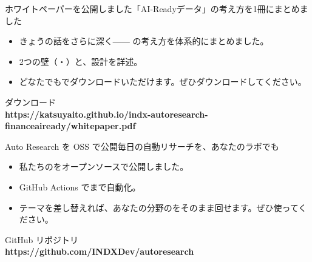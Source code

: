 
\begin{frame}{ホワイトペーパーを公開しました}{「AI-Readyデータ」の考え方を1冊にまとめました}
  \begin{itemize}\small\setlength\itemsep{2.4mm}
    \item きょうの話をさらに深く―― の考え方を体系的にまとめました。
    \item 2つの壁（・）と、設計を詳述。
    \item どなたでもでダウンロードいただけます。ぜひダウンロードしてください。
  \end{itemize}
  \vfill
  \begin{tcolorbox}[enhanced,colback=brandnavy!5,colframe=brandnavy,boxrule=0.8pt,arc=1.4mm,
    left=3mm,right=3mm,top=2.2mm,bottom=2.2mm,halign=center]
    {\footnotesize\color{brandgray}ダウンロード}\\[1mm]
    \mbox{{\small\color{brandblue}\bfseries https://katsuyaito.github.io/indx-autoresearch-financeaiready/whitepaper.pdf}}
  \end{tcolorbox}
  \vskip1mm
\end{frame}

\begin{frame}{Auto Research を OSS で公開}{毎日の自動リサーチを、あなたのラボでも}
  \begin{itemize}\small\setlength\itemsep{2.4mm}
    \item 私たちのをオープンソースで公開しました。
    \item GitHub Actions でまで自動化。
    \item テーマを差し替えれば、あなたの分野のをそのまま回せます。ぜひ使ってください。
  \end{itemize}
  \vfill
  \begin{tcolorbox}[enhanced,colback=brandnavy!5,colframe=brandnavy,boxrule=0.8pt,arc=1.4mm,
    left=3mm,right=3mm,top=2.2mm,bottom=2.2mm,halign=center]
    {\footnotesize\color{brandgray}GitHub リポジトリ}\\[1mm]
    \mbox{{\color{brandblue}\bfseries https://github.com/INDXDev/autoresearch}}
  \end{tcolorbox}
  \vskip1mm
\end{frame}

